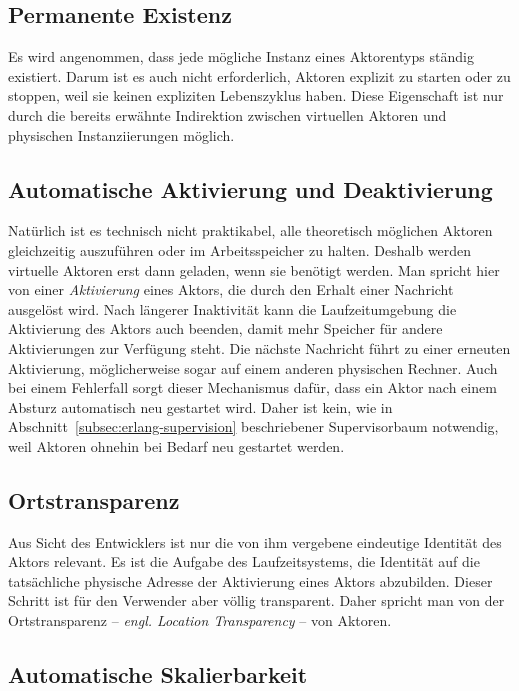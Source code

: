 \subsection{Permanente Existenz}

Es wird angenommen, dass jede mögliche Instanz eines Aktorentyps ständig existiert. Darum ist es auch nicht erforderlich, Aktoren explizit zu starten oder zu stoppen, weil sie keinen expliziten Lebenszyklus haben. Diese Eigenschaft ist nur durch die bereits erwähnte Indirektion zwischen virtuellen Aktoren und physischen Instanziierungen möglich.

\subsection{Automatische Aktivierung und Deaktivierung}

Natürlich ist es technisch nicht praktikabel, alle theoretisch möglichen Aktoren gleichzeitig auszuführen oder im Arbeitsspeicher zu halten. Deshalb werden virtuelle Aktoren erst dann geladen, wenn sie benötigt werden. Man spricht hier von einer \textit{Aktivierung} eines Aktors, die \zB durch den Erhalt einer Nachricht ausgelöst wird. Nach längerer Inaktivität kann die Laufzeitumgebung die Aktivierung des Aktors auch beenden, damit mehr Speicher für andere Aktivierungen zur Verfügung steht. Die nächste Nachricht führt zu einer erneuten Aktivierung, möglicherweise sogar auf einem anderen physischen Rechner. Auch bei einem Fehlerfall sorgt dieser Mechanismus dafür, dass ein Aktor nach einem Absturz automatisch neu gestartet wird. Daher ist kein, wie in Abschnitt~\ref{subsec:erlang-supervision} beschriebener Supervisorbaum notwendig, weil Aktoren ohnehin bei Bedarf neu gestartet werden.

\subsection{Ortstransparenz}

Aus Sicht des Entwicklers ist nur die von ihm vergebene eindeutige Identität des Aktors relevant. Es ist die Aufgabe des Laufzeitsystems, die Identität auf die tatsächliche physische Adresse der Aktivierung eines Aktors abzubilden. Dieser Schritt ist für den Verwender aber völlig transparent. Daher spricht man von der Ortstransparenz -- \textit{engl. Location Transparency} -- von Aktoren.

\subsection{Automatische Skalierbarkeit}

